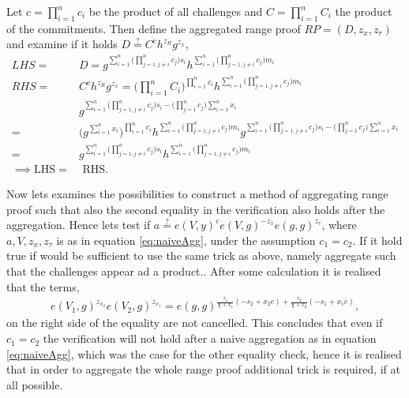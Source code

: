 Let $c=\prod_{i=1}^n c_i$ be the product of all challenges and $C= \prod_{i=1}^n C_i$ the product of the commitments.  Then define the aggregated range proof $RP = (D,z_x,z_r)$ and examine if it holds $D\overset{?}{=} C^ch^{z_R}g^{z_x}$, 
\begin{align*}
LHS =& D = g ^ {\sum_{i=1}^n \Big(\prod_{j=1, j\neq i}^n   c_j \Big)s_i} h^ {\sum_{i=1}^n \Big(\prod_{j=1, j\neq i}^n   c_j \Big)m_i}  \\
RHS =& C^ch^{z_R}g^{z_x} =  \Big( \prod_{i=1}^n C_i \Big)^{\prod_{i=1}^n c_i}h^{\sum_{i=1}^n \Big( \prod_{j=1, j\neq i}^n c_j \Big)m_i}\\
&g^{ \sum_{i=1}^n \Big( \prod_{j=1, j\neq i}^n c_j \Big)s_i - \big( \prod_{j=1}^n c_j \Big) \sum_{i=1}^n x_i}\\ 
 =& \Big( g^{\sum_{i=1}^n x_i} \Big)^{\prod_{i=1}^n c_i}h^{\sum_{i=1}^n \Big( \prod_{j=1, j\neq i}^n c_j \Big)m_i} g^{ \sum_{i=1}^n \Big( \prod_{j=1, j\neq i}^n c_j \Big)s_i - \big( \prod_{j=1}^n c_j \Big) \sum_{i=1}^n x_i} \\
=&  g^{  \sum_{i=1}^n \Big( \prod_{j=1, j\neq i}^n c_j \Big)s_i } h^{\sum_{i=1}^n \Big( \prod_{j=1, j\neq i}^n c_j \Big)m_i}  
\\ \implies \text{LHS} =& \text{ RHS}.
\end{align*}



Now lets examines the possibilities to construct a method of aggregating range proof such that also the second equality in the verification also holds after the aggregation. Hence lets test if $a \overset{?}{=} e(V,y)^c e(V,g)^{-z_x}e(g,g)^{z_\tau}$, where $a,V,z_{x},z_\tau$  is as in equation \eqref{eq:naiveAgg}, under the assumption $c_1=c_2$. If it hold true if would be sufficient to use the same trick as above, namely aggregate such that the challenges appear ad a product.. After some calculation it is realised that the terms,
\begin{align*}
e(V_1,g)^{z_{x_2}}e(V_2,g)^{z_{x_1}} = e(g,g)^{\frac{\tau_1}{\chi + x_1}(-s_2+x_2c) +\frac{\tau_2}{\chi + x_2}(-s_1+x_1c)   } ,
\end{align*}
on the right side of the equality are not cancelled. This concludes that even if $c_1=c_2$ the verification will not hold after a naive aggregation as in equation \eqref{eq:naiveAgg}, which was the case for the other equality check,  hence it is realised that in order to aggregate the whole range proof additional trick is required, if at all possible. 



